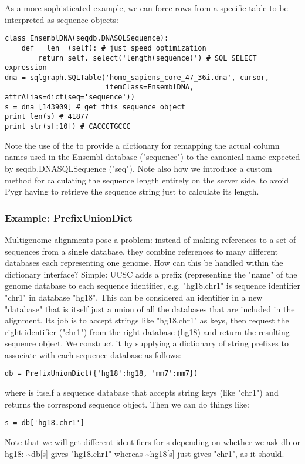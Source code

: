 \documentclass{howto}
\begin{document}
\begin{itemize}
As a more sophisticated example, we can force rows from a specific table
to be interpreted as sequence objects:
\begin{verbatim}
class EnsemblDNA(seqdb.DNASQLSequence):
    def __len__(self): # just speed optimization
        return self._select('length(sequence)') # SQL SELECT expression
dna = sqlgraph.SQLTable('homo_sapiens_core_47_36i.dna', cursor, 
                        itemClass=EnsemblDNA, attrAlias=dict(seq='sequence'))
s = dna [143909] # get this sequence object
print len(s) # 41877
print str(s[:10]) # CACCCTGCCC
\end{verbatim}
Note the use of the  to provide a dictionary for remapping
the actual column names used in the Ensembl database ("sequence") to the
canonical name expected by seqdb.DNASQLSequence ("seq").  Note also how
we introduce a custom method for calculating the sequence length entirely on
the server side, to avoid Pygr having to retrieve the sequence string just to 
calculate its length.


\subsubsection{Example: PrefixUnionDict}
Multigenome alignments pose a problem: instead of making references to 
a set of sequences from a single database, they combine references to many
different databases each representing one genome.  How can this be handled
within the dictionary interface?  Simple: UCSC adds a prefix (representing the
"name" of the genome database to each sequence identifier, e.g. "hg18.chr1" is
sequence identifier "chr1" in database "hg18".  This can be considered an
identifier in a new "database" that is itself just a union of all the databases
that are included in the alignment.  Its job is to accept strings like "hg18.chr1"
as keys, then request the right identifier ("chr1") from the right database (hg18)
and return the resulting sequence object.
We construct it by supplying a dictionary of string prefixes to associate
with each sequence database as follows:
\begin{verbatim}
db = PrefixUnionDict({'hg18':hg18, 'mm7':mm7})
\end{verbatim}
where  is itself a sequence database that accepts string keys
(like "chr1") and returns the correspond sequence object.  Then we can
do things like:
\begin{verbatim}
s = db['hg18.chr1']
\end{verbatim}
Note that we will get different identifiers for s depending on whether
we ask db or hg18: \textasciitilde db[s] gives "hg18.chr1" whereas
\textasciitilde hg18[s] just gives "chr1", as it should.
\end{itemize}
\end{document}
